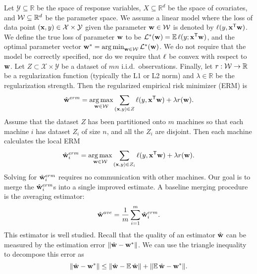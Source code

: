 \documentclass[thesis.tex]{subfiles}
\newcommand{\Y}{\mathcal{Y}}
\newcommand{\X}{\mathcal{X}}
\begin{document}
\vspace{-0.05in}
Let $\Y\subseteq\mathbb{R}$ be the space of response variables,
$X\subseteq\mathbb{R}^d$ be the space of covariates,
and ${\mathcal W}\subseteq\mathbb{R}^d$ be the parameter space.
We assume a linear model where the loss of data point $(\x,y)\in\X\times\Y$ given the parameter $\mathbf w\in{\mathcal W}$ is denoted by $\ell(y,{\mathbf{x}}^{\mathsf{T}}\mathbf w)$.
We define the true loss of parameter $\mathbf w$ to be $\mathcal{L}^*(\mathbf w) = \operatorname*{\mathbb E}\ell(y;{\mathbf{x}}^{\mathsf{T}}\mathbf w)$, 
and the optimal parameter vector ${\mathbf w^{*}}=\operatorname*{arg\,min}_{\mathbf w\in{\mathcal W}}\mathcal{L}^*(\mathbf w)$.
We do not require that the model be correctly specified,
nor do we require that $\ell$ be convex with respect to $\mathbf w$.
Let $Z\subset\X\times\Y$ be a dataset of $mn$ i.i.d.\ observations.
Finally, let $r : {\mathcal W} \to \mathbb{R}$ be a regularization function (typically the L1 or L2 norm)
and $\lambda\in\mathbb{R}$ be the regularization strength.
Then the regularized empirical risk minimizer (ERM) is
\begin{equation}
\label{eq:wmle}
\hat{\mathbf w}^{erm}=\operatorname*{arg\,max}_{\mathbf w\in{\mathcal W}} \sum_{(\mathbf{x},y)\in Z} \ell(y,{\mathbf{x}}^{\mathsf{T}}\mathbf w)
+ \lambda r(\mathbf w)
.
\end{equation}
%
Assume that the dataset $Z$ has been partitioned onto $m$ machines so that each machine $i$ has dataset $Z_i$ of size $n$, and all the $Z_i$ are disjoint.
Then each machine calculates the local ERM
\begin{equation}
\label{eq:wmlei}
\hat{\mathbf w}^{erm}_i = \operatorname*{arg\,max}_{\mathbf w\in{\mathcal W}} \sum_{(\mathbf{x},y) \in Z_i} \ell(y,{\mathbf{x}}^{\mathsf{T}}\mathbf w)
+ \lambda r(\mathbf w)
.
\end{equation}
Solving for $\hat{\mathbf w}^{erm}_i$ requires no communication with other machines.
Our goal is to merge the $\hat{\mathbf w}^{erm}_i$s into a single improved estimate.
A baseline merging procedure is the averaging estimator:
\begin{equation}
\hat{\mathbf w}^{ave} = \frac{1}{m}\sum_{i=1}^m \hat{\mathbf w}^{erm}_i
.
\end{equation}
This estimator is well studied.
Recall that the quality of an estimator ${\hat{\mathbf w}}$ can be measured by the estimation error ${\lVert {{\hat{\mathbf w}}-{\mathbf w^{*}}} \rVert}$. 
We can use the triangle inequality to decompose this error as
\begin{equation}
{\lVert {{\hat{\mathbf w}}-{\mathbf w^{*}}} \rVert} \le {\lVert {{\hat{\mathbf w}}-\operatorname*{\mathbb E}{\hat{\mathbf w}}} \rVert}+ {\lVert {\operatorname*{\mathbb E}{\hat{\mathbf w}}- {\mathbf w^{*}}} \rVert} .
\end{equation}
\end{document}
